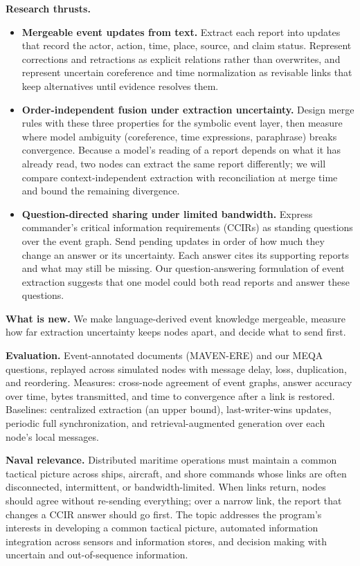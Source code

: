 \documentclass[11pt]{article}
\newcommand{\head}[1]{{\color{navy}\textbf{#1}}\enspace}
\begin{document}
\head{Research thrusts.}
\begin{itemize}
\item \textbf{Mergeable event updates from text.} Extract each report into updates that record the actor, action, time, place, source, and claim status. Represent corrections and retractions as explicit relations rather than overwrites, and represent uncertain coreference and time normalization as revisable links that keep alternatives until evidence resolves them.
\item \textbf{Order-independent fusion under extraction uncertainty.} Design merge rules with these three properties for the symbolic event layer, then measure where model ambiguity (coreference, time expressions, paraphrase) breaks convergence. Because a model's reading of a report depends on what it has already read, two nodes can extract the same report differently; we will compare context-independent extraction with reconciliation at merge time and bound the remaining divergence.
\item \textbf{Question-directed sharing under limited bandwidth.} Express commander's critical information requirements (CCIRs) as standing questions over the event graph. Send pending updates in order of how much they change an answer or its uncertainty. Each answer cites its supporting reports and what may still be missing. Our question-answering formulation of event extraction suggests that one model could both read reports and answer these questions.
\end{itemize}

\head{What is new.} We make language-derived event knowledge mergeable, measure how far extraction uncertainty keeps nodes apart, and decide what to send first.

\head{Evaluation.} Event-annotated documents (MAVEN-ERE) and our MEQA questions, replayed across simulated nodes with message delay, loss, duplication, and reordering. Measures: cross-node agreement of event graphs, answer accuracy over time, bytes transmitted, and time to convergence after a link is restored. Baselines: centralized extraction (an upper bound), last-writer-wins updates, periodic full synchronization, and retrieval-augmented generation over each node's local messages.

\head{Naval relevance.} Distributed maritime operations must maintain a common tactical picture across ships, aircraft, and shore commands whose links are often disconnected, intermittent, or bandwidth-limited. When links return, nodes should agree without re-sending everything; over a narrow link, the report that changes a CCIR answer should go first. The topic addresses the program's interests in developing a common tactical picture, automated information integration across sensors and information stores, and decision making with uncertain and out-of-sequence information.
\end{document}
